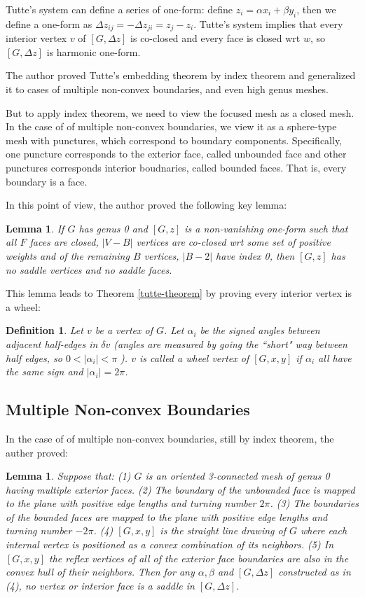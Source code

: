 \documentclass[fleqn,10pt]{wlscirep}
\newtheorem{definition}{Definition}[section]
\newtheorem{lemma}[theorem]{Lemma}
\begin{document}
Tutte's system can define a series of one-form:
define $z_i = \alpha x_i + \beta y_i$, then we define a one-form as $\Delta z_{ij} = -\Delta z_{ji} = z_j - z_i$. Tutte's system implies that every interior vertex $v$ of $[G,  \Delta z]$ is co-closed and every face is closed wrt $w$, so $[G,  \Delta z]$ is harmonic one-form.

The author proved Tutte's embedding theorem by index theorem and generalized it to cases of multiple non-convex boundaries, and even high genus meshes. 

But to apply index theorem, we need to view the focused mesh as a closed mesh. In the case of of multiple non-convex boundaries, we view it as a sphere-type mesh with punctures, which correspond to boundary components. Specifically, one puncture corresponds to the exterior face, called unbounded face and other punctures corresponds interior boudnaries, called bounded faces. That is, every boundary is a face.

In this point of view, the author proved the following key lemma:
\begin{lemma}
If $G$ has genus 0 and $[G,  z]$ is a non-vanishing one-form such that all $F$ faces are closed, $|V - B|$ vertices are co-closed wrt some set of positive weights and of the remaining $B$ vertices, $|B - 2|$ have index   0, then $[G,  z]$ has no saddle vertices and no saddle faces.
\end{lemma}



This lemma leads to Theorem \ref{tutte-theorem} by proving every interior vertex is a wheel:
\begin{definition}
Let $v$ be a vertex of $G$. Let $\alpha_i$ be the signed angles between adjacent half-edges in $\delta v$
(angles are measured by going the ``short" way between half edges, so $0 < |\alpha_i| < \pi$ ). $v$ is called a wheel vertex of $[G,x,y]$ if $\alpha_i$ all have the same sign and $|
\alpha_i|=2\pi$.
\end{definition}

\subsection{Multiple Non-convex Boundaries}

In the case of of multiple non-convex boundaries, still by index theorem, the auther proved:
\begin{lemma} \label{multi-boundary}
Suppose that: (1) $G$ is an oriented 3-connected mesh of genus 0 having multiple exterior faces. (2) The boundary of the unbounded face is mapped to the plane with positive edge lengths and turning number $2\pi$. (3) The boundaries of the bounded faces are mapped to the plane with positive edge lengths and turning number $-2\pi$. (4) $[G,x,y]$ is the straight line drawing of $G$ where each internal vertex is positioned as a convex combination of its neighbors. (5) In $[G,x,y]$ the reflex vertices of all of the exterior face boundaries are also in the convex hull of their neighbors. Then for any $\alpha, \beta$ and $[G,  \Delta z]$ constructed as in (4), no vertex or interior face is a saddle in $[G,  \Delta z]$.
\end{lemma}
\end{document}
